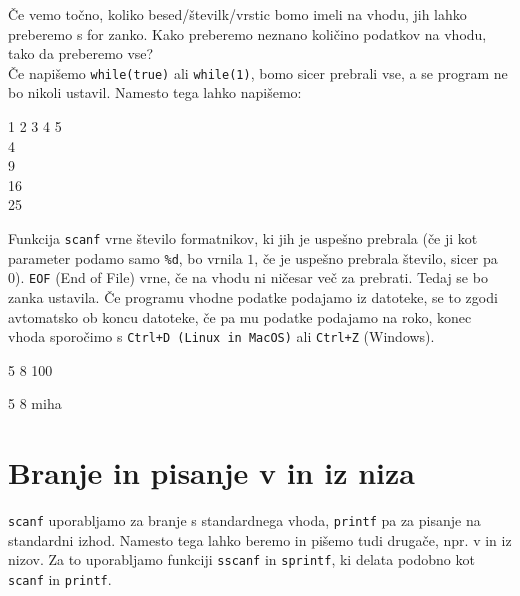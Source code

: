 Če vemo točno, koliko besed/številk/vrstic bomo imeli na vhodu, jih lahko preberemo s for zanko. Kako preberemo neznano količino podatkov na vhodu, tako da preberemo vse? \\
Če napišemo \verb+while(true)+ ali \verb+while(1)+, bomo sicer prebrali vse, a se program ne bo nikoli ustavil.
Namesto tega lahko napišemo:

\begin{examples}


\begin{inout}
1 2 3 4 5
\\4\\9\\16\\25
\end{inout}
\end{examples}

\vskip 0.15in
\noindent Funkcija \verb+scanf+ vrne število formatnikov, ki jih je uspešno
prebrala (če ji kot parameter podamo samo \verb+%d+, bo vrnila $1$, če je
uspešno prebrala število, sicer pa 0). \verb+EOF+ (End of File) vrne, če na
vhodu ni ničesar več za prebrati. Tedaj se bo zanka ustavila. Če programu
vhodne podatke podajamo iz datoteke, se to zgodi avtomatsko ob koncu datoteke,
če pa mu podatke podajamo na roko, konec vhoda sporočimo s
\verb-Ctrl+D (Linux in MacOS)- ali \verb-Ctrl+Z- (Windows).

\begin{examples}


\begin{inout}
	5 8 100
\end{inout}
\begin{inout}
	5 8 miha
\end{inout}


\end{examples}

\pagebreak
\section{Branje in pisanje v in iz niza}

\verb+scanf+ uporabljamo za branje s standardnega vhoda, \verb+printf+ pa za pisanje na standardni izhod.
Namesto tega lahko beremo in pišemo tudi drugače, npr. v in iz nizov.
Za to uporabljamo funkciji \verb+sscanf+ in \verb+sprintf+, ki delata podobno kot \verb+scanf+ in \verb+printf+.

